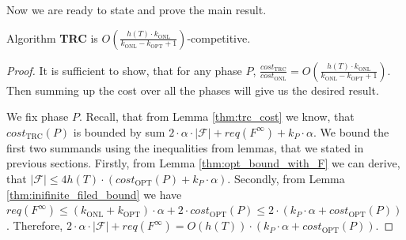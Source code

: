 Now we are ready to state and prove the main result.
\begin{theorem}
Algorithm \textbf{TRC} is $O(\frac{h(T) \cdot k_{\mathrm{ONL}}}{k_{\mathrm{ONL}} 
- k_{\mathrm{OPT}} + 1})$-competitive.
\label{thm:main_theorem}
\end{theorem}
\begin{proof}
It is sufficient to show, that for any phase $P$, 
$\frac{cost_{\mathrm{TRC}}}{cost_{\mathrm{ONL}}} = O(\frac{h(T) \cdot 
k_{\mathrm{ONL}}}{k_{\mathrm{ONL}} - k_{\mathrm{OPT}} + 1})$. Then summing up 
the cost over all the phases will give us the desired result.

We fix phase $P$. Recall, that from Lemma \ref{thm:trc_cost} we know, that 
$cost_{\mathrm{TRC}}(P)$ is bounded by sum $2 \cdot \alpha \cdot |\mathcal{F}| 
+ req(F^{\infty}) + k_P \cdot \alpha$. We bound the first two summands using 
the inequalities from lemmas, that we stated in previous sections. Firstly, from Lemma 
\ref{thm:opt_bound_with_F} we can derive, that $|\mathcal{F}| \leq 
4h(T) \cdot (cost_{\mathrm{OPT}}(P) + k_P \cdot \alpha)$. Secondly, from Lemma 
\ref{thm:inifinite_filed_bound} we have $req(F^{\infty}) \leq 
(k_{\mathrm{ONL}} + k_{\mathrm{OPT}}) \cdot \alpha + 2 \cdot 
cost_{\mathrm{OPT}}(P) \leq 2 \cdot (k_P \cdot \alpha + 
cost_{\mathrm{OPT}}(P))$. Therefore, $2 \cdot \alpha \cdot |\mathcal{F}| + 
req(F^{\infty}) = O(h(T)) \cdot (k_P \cdot \alpha + cost_{\mathrm{OPT}}(P))$.
\end{proof}

